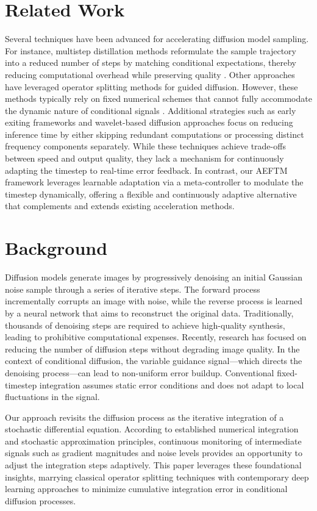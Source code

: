 \documentclass{article} %
\begin{document}
\section{Related Work}
\label{sec:related}
Several techniques have been advanced for accelerating diffusion model sampling. For instance, multistep distillation methods reformulate the sample trajectory into a reduced number of steps by matching conditional expectations, thereby reducing computational overhead while preserving quality \cite{salimans2024multistep}. Other approaches have leveraged operator splitting methods for guided diffusion. However, these methods typically rely on fixed numerical schemes that cannot fully accommodate the dynamic nature of conditional signals \cite{wizadwongsa2023accelerating}. Additional strategies such as early exiting frameworks \cite{moon2024simple} and wavelet-based diffusion approaches \cite{phung2022wavelet} focus on reducing inference time by either skipping redundant computations or processing distinct frequency components separately. While these techniques achieve trade-offs between speed and output quality, they lack a mechanism for continuously adapting the timestep to real-time error feedback. In contrast, our AEFTM framework leverages learnable adaptation via a meta-controller to modulate the timestep dynamically, offering a flexible and continuously adaptive alternative that complements and extends existing acceleration methods.

\section{Background}
\label{sec:background}
Diffusion models generate images by progressively denoising an initial Gaussian noise sample through a series of iterative steps. The forward process incrementally corrupts an image with noise, while the reverse process is learned by a neural network that aims to reconstruct the original data. Traditionally, thousands of denoising steps are required to achieve high-quality synthesis, leading to prohibitive computational expenses. Recently, research has focused on reducing the number of diffusion steps without degrading image quality. In the context of conditional diffusion, the variable guidance signal—which directs the denoising process—can lead to non-uniform error buildup. Conventional fixed-timestep integration assumes static error conditions and does not adapt to local fluctuations in the signal.

Our approach revisits the diffusion process as the iterative integration of a stochastic differential equation. According to established numerical integration and stochastic approximation principles, continuous monitoring of intermediate signals such as gradient magnitudes and noise levels provides an opportunity to adjust the integration steps adaptively. This paper leverages these foundational insights, marrying classical operator splitting techniques with contemporary deep learning approaches to minimize cumulative integration error in conditional diffusion processes.
\end{document}
